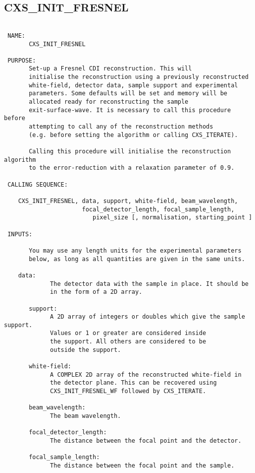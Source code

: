 \subsection{CXS\_INIT\_FRESNEL}
\begin{verbatim}

 NAME:
       CXS_INIT_FRESNEL

 PURPOSE:
       Set-up a Fresnel CDI reconstruction. This will
       initialise the reconstruction using a previously reconstructed
       white-field, detector data, sample support and experimental 
       parameters. Some defaults will be set and memory will be
       allocated ready for reconstructing the sample
       exit-surface-wave. It is necessary to call this procedure before
       attempting to call any of the reconstruction methods
       (e.g. before setting the algorithm or calling CXS_ITERATE).

       Calling this procedure will initialise the reconstruction algorithm
       to the error-reduction with a relaxation parameter of 0.9.

 CALLING SEQUENCE:

	CXS_INIT_FRESNEL, data, support, white-field, beam_wavelength,
	                  focal_detector_length, focal_sample_length, 
                         pixel_size [, normalisation, starting_point ]

 INPUTS:

       You may use any length units for the experimental parameters
       below, as long as all quantities are given in the same units.

	data: 
             The detector data with the sample in place. It should be
             in the form of a 2D array.

       support: 
             A 2D array of integers or doubles which give the sample support.
             Values or 1 or greater are considered inside
             the support. All others are considered to be
             outside the support.

       white-field:
             A COMPLEX 2D array of the reconstructed white-field in
             the detector plane. This can be recovered using 
             CXS_INIT_FRESNEL_WF followed by CXS_ITERATE.

       beam_wavelength:
             The beam wavelength.

       focal_detector_length:
             The distance between the focal point and the detector.

       focal_sample_length:
             The distance between the focal point and the sample.


\end{verbatim}
